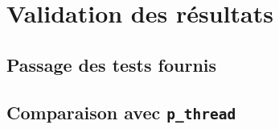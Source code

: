 \section{Validation des résultats}

\subsection{Passage des tests fournis}
\subsection{Comparaison avec \texttt{p\_thread}}
